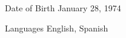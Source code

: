 

\begin{cvskills}

  \cvskill
    {Date of Birth} %
    {January 28, 1974} %

  \cvskill
    {Languages} %
    {English, Spanish} %

\end{cvskills}
